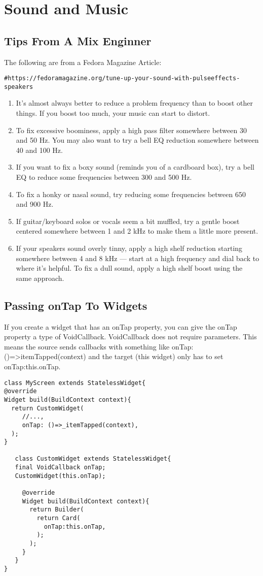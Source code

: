 \documentclass{article}
\begin{document}
\section{Sound and Music}
\subsection{Tips From A Mix Enginner}
The following are from a Fedora Magazine Article: 
\begin{verbatim}
#https://fedoramagazine.org/tune-up-your-sound-with-pulseeffects-speakers
\end{verbatim}
\begin{enumerate}
\item    It’s almost always better to reduce a problem frequency than to boost other things. If you boost too much, your music can start to distort.
\item    To fix excessive boominess, apply a high pass filter somewhere between 30 and 50 Hz. You may also want to try a bell EQ reduction somewhere between 40 and 100 Hz.
\item    If you want to fix a boxy sound (reminds you of a cardboard box), try a bell EQ to reduce some frequencies between 300 and 500 Hz.
\item    To fix a honky or nasal sound, try reducing some frequencies between 650 and 900 Hz.
\item    If guitar/keyboard solos or vocals seem a bit muffled, try a gentle boost centered somewhere between 1 and 2 kHz to make them a little more present.
\item    If your speakers sound overly tinny, apply a high shelf reduction starting somewhere between 4 and 8 kHz — start at a high frequency and dial back to where it’s helpful. To fix a dull sound, apply a high shelf boost using the same approach.
\end{enumerate}


\subsection{Passing onTap To Widgets}
If you create a widget that has an onTap property, you can give the onTap property a type of VoidCallback. VoidCallback does not require parameters. This means the source sends callbacks with something like onTap: ()=>itemTapped(context) and the target (this widget) only has to set onTap:this.onTap. 

\begin{verbatim}
class MyScreen extends StatelessWidget{
@override 
Widget build(BuildContext context){
  return CustomWidget(
     //...,
     onTap: ()=>_itemTapped(context),
  );
}
   
   class CustomWidget extends StatelessWidget{
   final VoidCallback onTap;
   CustomWidget(this.onTap);
   
     @override
     Widget build(BuildContext context){
       return Builder(
         return Card(
           onTap:this.onTap,         
         );
       );
     }
   }
}
\end{verbatim}
\end{document}
